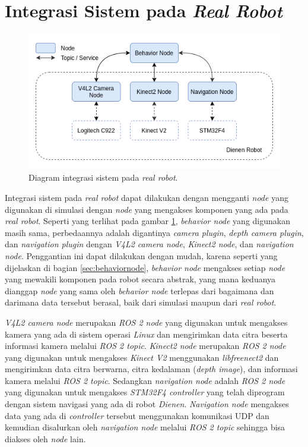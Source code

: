\section{Integrasi Sistem pada \emph{Real Robot}}
\label{sec:integrasirobot}

\begin{figure}[ht]
  \centering
  \includegraphics[scale=0.55]{gambar/integrasi-real-robot.png}
  \caption{Diagram integrasi sistem pada \emph{real robot}.}
  \label{fig:integrasirealrobot}
\end{figure}

Integrasi sistem pada \emph{real robot} dapat dilakukan dengan mengganti \emph{node} yang digunakan di simulasi dengan \emph{node} yang mengakses komponen yang ada pada \emph{real robot}.
Seperti yang terlihat pada gambar \ref{fig:integrasirealrobot},
  \emph{behavior node} yang digunakan masih sama,
  perbedaannya adalah digantinya \emph{camera plugin}, \emph{depth camera plugin}, dan \emph{navigation plugin} dengan \emph{V4L2 camera node}, \emph{Kinect2 node}, dan \emph{navigation node}.
Penggantian ini dapat dilakukan dengan mudah,
  karena seperti yang dijelaskan di bagian \ref{sec:behaviornode},
  \emph{behavior node} mengakses setiap \emph{node} yang mewakili komponen pada robot secara abstrak,
  yang mana keduanya dianggap \emph{node} yang sama oleh \emph{behavior node} terlepas dari bagaimana dan darimana data tersebut berasal,
  baik dari simulasi maupun dari \emph{real robot}.

\emph{V4L2 camera node} merupakan \emph{ROS 2 node} yang digunakan untuk mengakses kamera yang ada di sistem operasi \emph{Linux} dan mengirimkan data citra beserta informasi kamera melalui \emph{ROS 2 topic}.
\emph{Kinect2 node} merupakan \emph{ROS 2 node} yang digunakan untuk mengakses \emph{Kinect V2} menggunakan \emph{libfreenect2} dan mengirimkan data citra berwarna, citra kedalaman (\emph{depth image}), dan informasi kamera melalui \emph{ROS 2 topic}.
Sedangkan \emph{navigation node} adalah \emph{ROS 2 node} yang digunakan untuk mengakses \emph{STM32F4 controller} yang telah diprogram dengan sistem navigasi yang ada di robot \emph{Dienen}.
\emph{Navigation node} mengakses data yang ada di \emph{controller} tersebut menggunakan komunikasi UDP dan kemudian disalurkan oleh \emph{navigation node} melalui \emph{ROS 2 topic} sehingga bisa diakses oleh \emph{node} lain.

